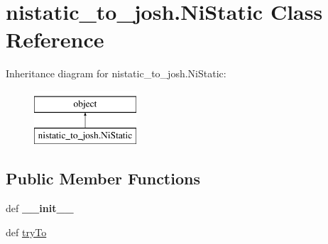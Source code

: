\hypertarget{classnistatic__to__josh_1_1_ni_static}{\section{nistatic\-\_\-to\-\_\-josh.\-Ni\-Static Class Reference}
\label{classnistatic__to__josh_1_1_ni_static}
}
Inheritance diagram for nistatic\-\_\-to\-\_\-josh.\-Ni\-Static\-:\begin{figure}[H]
\begin{center}
\leavevmode
\includegraphics[height=2.000000cm]{classnistatic__to__josh_1_1_ni_static}
\end{center}
\end{figure}
\subsection*{Public Member Functions}
\begin{DoxyCompactItemize}
\item 
\hypertarget{classnistatic__to__josh_1_1_ni_static_a31c5d2cae95477cb7f186f2722c7f944}{def {\bfseries \-\_\-\-\_\-init\-\_\-\-\_\-}}\label{classnistatic__to__josh_1_1_ni_static_a31c5d2cae95477cb7f186f2722c7f944}

\item 
def \hyperlink{classnistatic__to__josh_1_1_ni_static_aec11a6c2545498d7c7a4182217d842d5}{try\-To}
\end{DoxyCompactItemize}
